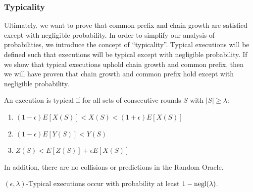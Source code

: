 \subsubsection{Typicality}

Ultimately, we want to prove that common prefix and chain growth are satisfied except with negligible probability. In order to simplify our analysis of probabilities, we introduce the concept of ``typicality''. Typical executions will be defined such that executions will be typical except with negligible probability. If we show that typical executions uphold chain growth and common prefix, then we will have proven that chain growth and common prefix hold except with negligible probability.

\begin{definition}
An execution is typical if for all sets of consecutive rounds $S$ with $|S| \geq \lambda$:
\begin{enumerate}
    \item $(1-\epsilon) E[X(S)] < X(S) < (1+\epsilon) E[X(S)]$
    \item $(1-\epsilon) E[Y(S)] < Y(S) $
    \item $ Z(S) < E[Z(S)] + \epsilon E[X(S)] $
\end{enumerate}
In addition, there are no collisions or predictions in the Random Oracle.
\end{definition}

\begin{theorem}
$(\epsilon,\lambda)$-Typical executions occur with probability at least $1-\mathrm{negl}(\lambda)$.
\end{theorem}

